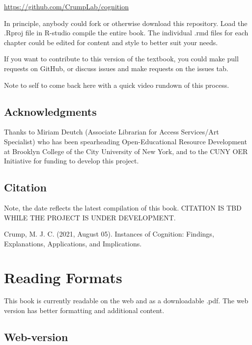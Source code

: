 \documentclass[
  oneside,
  12pt]{crumpbook}
\begin{document}
\url{https://github.com/CrumpLab/cognition}

In principle, anybody could fork or otherwise download this repository. Load the .Rproj file in R-studio compile the entire book. The individual .rmd files for each chapter could be edited for content and style to better suit your needs.

If you want to contribute to this version of the textbook, you could make pull requests on GitHub, or discuss issues and make requests on the issues tab.

Note to self to come back here with a quick video rundown of this process.

\hypertarget{acknowledgments}{%
\section{Acknowledgments}\label{acknowledgments}}

Thanks to Miriam Deutch (Associate Librarian for Access Services/Art Specialist) who has been spearheading Open-Educational Resource Development at Brooklyn College of the City University of New York, and to the CUNY OER Initiative for funding to develop this project.

\hypertarget{citation}{%
\section{Citation}\label{citation}}

Note, the date reflects the latest compilation of this book. CITATION IS TBD WHILE THE PROJECT IS UNDER DEVELOPMENT.

Crump, M. J. C. (2021, August 05). Instances of Cognition: Findings, Explanations, Applications, and Implications.

\hypertarget{reading-formats}{%
\chapter*{Reading Formats}\label{reading-formats}}

This book is currently readable on the web and as a downloadable .pdf. The web version has better formatting and additional content.

\hypertarget{web-version}{%
\section{Web-version}\label{web-version}}
\end{document}
